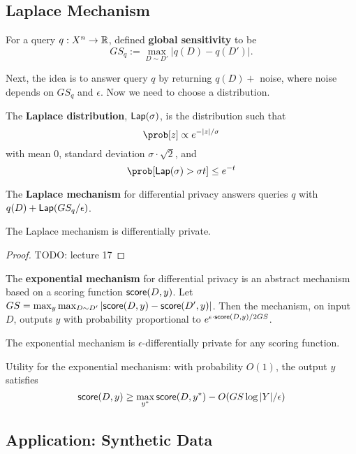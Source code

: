 \subsection{Laplace Mechanism}

\begin{defn}
For a query $q : X^n \to \mathbb{R}$, defined \textbf{global sensitivity} to be
\[
    GS_q := \max_{D \sim D'}|q(D) - q(D')|.
\]
\end{defn}

Next, the idea is to answer query $q$ by returning $q(D) +$ noise, where noise depends on $GS_q$ and $\epsilon$.
Now we need to choose a distribution.

\begin{defn}
The \textbf{Laplace distribution}, $\mathsf{Lap}(\sigma)$, is the distribution such that 
\[
    \prob[z] \propto e^{-|z|/\sigma}
\]
with
mean $0$,
standard deviation $\sigma \cdot \sqrt{2}$, and
\[
    \prob[\Lap(\sigma) > \sigma t] \leq e^{-t}
\]
\end{defn}

\begin{defn}
The \textbf{Laplace mechanism} for differential privacy answers queries $q$ with $q(D) + \mathsf{Lap}(GS_q/\epsilon)$.
\end{defn}

\begin{thm}
The Laplace mechanism is differentially private.
\end{thm}
\begin{proof}
TODO: lecture 17
\end{proof}

\begin{defn}
The \textbf{exponential mechanism} for differential privacy is an abstract mechanism based on a scoring function $\mathsf{score}(D, y)$.
Let $GS = \max_y \max_{D \sim D'}|\mathsf{score}(D, y) - \mathsf{score}(D', y)|$.
Then the mechanism, on input $D$, outputs $y$ with probability proportional to $e^{\epsilon \cdot \mathsf{score}(D, y)/2 GS}$.
\end{defn}

\begin{lem}
The exponential mechanism is $\epsilon$-differentially private for any scoring function.
\end{lem}

Utility for the exponential mechanism: with probability $O(1)$, the output $y$ satisfies 
\[
    \mathsf{score}(D, y) \geq 
    \max_{y^*} \mathsf{score}(D, y^*) - O(GS \log|Y|/\epsilon)
\]

\subsection{Application: Synthetic Data}

